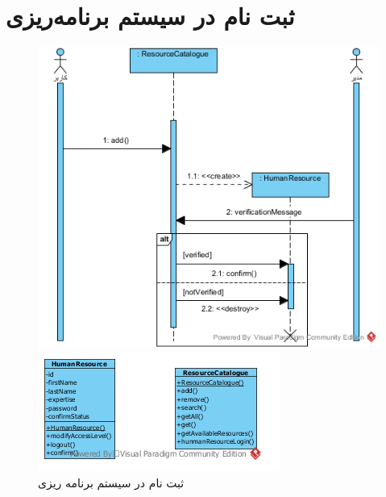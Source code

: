 \section{ثبت نام در سیستم برنامه‌ریزی}
\begin{figure}[H]
	\centering
	\includegraphics[scale=1]{img/sequence-analysis/SignUp}
	
	
	\includegraphics[scale=1]{img/sequence-analysis/SignUpC}
	\caption{ثبت نام در سیستم برنامه ریزی}
\end{figure}


